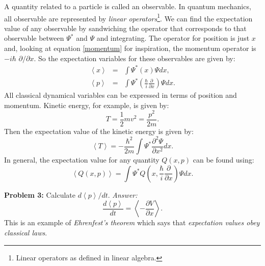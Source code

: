 \documentclass{article}
\begin{document}
A quantity related to a particle is called an observable. In quantum mechanics, all observable are represented by \emph{linear operators}\footnote{Linear operators as defined in linear algebra.}. We can find the expectation value of any observable by sandwiching the operator that corresponds to that observable between $\Psi^{*}$ and $\Psi$ and integrating. The operator for position is just $x$ and, looking at equation \ref{momentum} for inspiration, the momentum operator is $-i\hbar$ $\partial/\partial x$. So the expectation variables for these observables are given by:
\begin{eqnarray}
\left< x \right> &=& \int \Psi^{*} (x) \Psi dx, \\
\left< p \right > &=& \int \Psi^{*} \left( \frac{\hbar}{i} \frac{\partial}{\partial x} \right) \Psi dx.
\end{eqnarray}
All classical dynamical variables can be expressed in terms of position and momentum. Kinetic energy, for example, is given by:
\begin{equation}
T = \frac{1}{2}mv^{2} = \frac{p^{2}}{2m}.
\end{equation}
Then the expectation value of the kinetic energy is given by:
\begin{equation}
\left< T \right > = - \frac{\hbar^{2}}{2m} \int \Psi^{*}\frac{\partial^{2}\Psi}{\partial x^{2}} dx.
\end{equation}
In general, the expectation value for any quantity $Q(x,p)$ can be found using:
\begin{equation}
\boxed{\left< Q(x,p) \right> = \int \Psi^{*} Q \left( x,\frac{\hbar}{i}\frac{\partial}{\partial x} \right) \Psi dx.}
\end{equation}

\noindent\makebox[\linewidth]{\rule{\textwidth}{0.4pt}}
\textbf{Problem 3:} Calculate $d\left< p \right> / dt$. \emph{Answer:}
\begin{equation}
\frac{d\left< p \right>}{dt} = \left< - \frac{\partial V}{\partial x} \right>.
\end{equation}
This is an example of \emph{Ehrenfest's theorem} which says that \emph{expectation values obey classical laws}.
\end{document}
